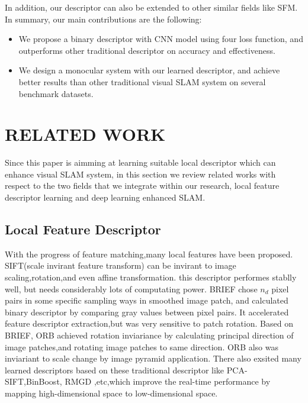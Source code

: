 \documentclass{svproc}
\begin{document}
In addition, our descriptor can also be extended to other similar fields like SFM. In summary, our main contributions are the following:
\begin{itemize}
\item We propose a binary descriptor with CNN model using four loss function, and outperforms other traditional descriptor on accuracy and effectiveness. 
\item We design a monocular system with our learned descriptor, and achieve better results than other traditional visual SLAM system on several benchmark datasets.
\end{itemize}

\section{RELATED WORK}
Since this paper is aimming at learning suitable local descriptor which can enhance visual SLAM system, in this section we review related works with respect to the two fields that we integrate within our research, local feature descriptor learning and deep learning enhanced SLAM.

\subsection{Local Feature Descriptor}
With the progress of feature matching,many local features have been proposed. SIFT(scale invirant feature transform) can be invirant to image scaling,rotation,and even affine transformation. this descriptor performes stablly well, but needs considerably lots of computating power. 
BRIEF chose $n_{d}$ pixel pairs in some specific sampling ways in smoothed image patch, and calculated binary descriptor by comparing gray values between pixel pairs. It accelerated feature descriptor extraction,but was very sensitive to patch rotation.  
Based on BRIEF, ORB achieved rotation inviariance by calculating principal direction of image patches,and rotating image patches to same direction. ORB also was inviariant to scale change by image pyramid application.
There also exsited many learned descriptors based on these traditional descriptor like PCA-SIFT,BinBoost, RMGD ,etc,which improve the real-time performance by mapping high-dimensional space to low-dimensional space. 
\end{document}
